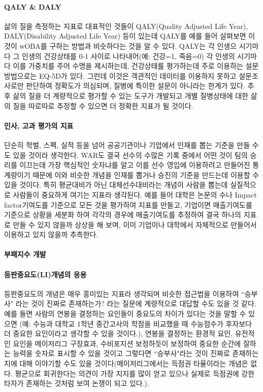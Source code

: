 \documentclass[11pt]{article}
\begin{document}
\paragraph{QALY \& DALY}
삶의 질을 측정하는 지표로 대표적인 것들이 QALY(Quality Adjusted Life Year), DALY(Disability Adjusted Life Year) 등이 있는데 QALY를 예를 들어 살펴보면 이것이 wOBA를 구하는 방법과 비슷하다는 것을 알 수 있다\cite{phillips1998qaly}. QALY는 각 인생으 시기마다 그 인생의 건강상태를 0-1 사이로 나타내어(예: 건강=1, 죽음=0) 각 인생의 시기마다 이를 가중치를 주어 수명을 제시하는데, 건강상태를 평가하는데 주로 이용하는 설문방법으로는 EQ-5D가 있다\cite{phillips1998qaly}. 그런데 이것은 객관적인 데이터를 이용하지 못하고 설문조사로만 판단하여 정확도가 의심되며, 질병에 특이한 설문이 아니라는 한계가 있다. 추후 삶의 질을 더 계량적으로 평가할 수 있는 도구가 개발되고 개별 질병상태에 대한 삶의 질을 따로따로 추정할 수 있으면 더 정확한 지표가 될 것이다. 

\paragraph{인사, 고과 평가의 지표}
 단순히 학벌, 스펙, 실적 등을 넘어 공공기관이나  기업에서 인재를 뽑는 기준을 만들 수도 있을 것이라 생각한다. WAR도 결국 선수의 수많은 기록 중에서 어떤 것이 팀의 승리를 이끄는데 가장 핵심적인 숫자냐를 알고 이를 선수 영입에 이용하려고 만들어진 통계량이기 때문에 이와 비슷한 개념을 인재를 뽑거나 승진의 기준을 만드는데 이용할 수 있을 것이다. 특히 평균대비가 아닌 대체선수대비라는 개념이 사람을 뽑는데 실질적으로 사람들이 중요하게 여기는 지표라 생각된다. 예를 들어 대학은 논문의 수나 Impact factor기여도를 기준으로 모든 것을 평가하여 지표를 만들고, 기업이면 매출기여도를 기준으로 상황을 세분화 하여 각각의 경우에 매출기여도를 추정하여 결국 하나의 지표로 만들 수 있지 않을까 상상을 해 보며, 이미 기업이나 대학에서 자체적으로 만들어서 이용하고 있지 않을까 추측한다. 

\paragraph{부패지수 개발}

\paragraph{등판중요도(LI)개념의 응용}
등판중요도의 개념은 매우 흥미있는 지표라 생각되며 비슷한 접근법을 이용하여 
``승부사" 라는 것이 진짜로 존재하는가? 라는 질문에 계량적으로 대답할 수도 있을 것 같다. 예를 들면 사람의 연봉을 결정하는 요인들이 중요도의 차이가 있다는 것을 말할 수 있으면 (예: 수능과 대학교 1학년 중간고사의 학점을 비교했을 때 수능점수가 후자보다 더 중요한 요인이라고 생각할 수 있을 것이다.), 연봉을 결정하는 환경적 요인, 유전적인 요인을 메이저리그 구장효과, 수비포지션 보정하듯이 보정하여 중요한 순간에 잘하는 능력을 숫자로 표시할 수 있을 것이고 그렇다면 ``승부사"라는 것이 진짜로 존재하는지에 대해 이야기할 수도 있을 것이다(메이저리그에서는 득점권 타율이라는 개념은 없다. 평균으로 회귀한다는 의견이 가장 지지를 많이 얻고 있으나 실제로 득점권에 강한 타자가 존재하는 것처럼 보여 논쟁이 되고 있다.).
\end{document}
